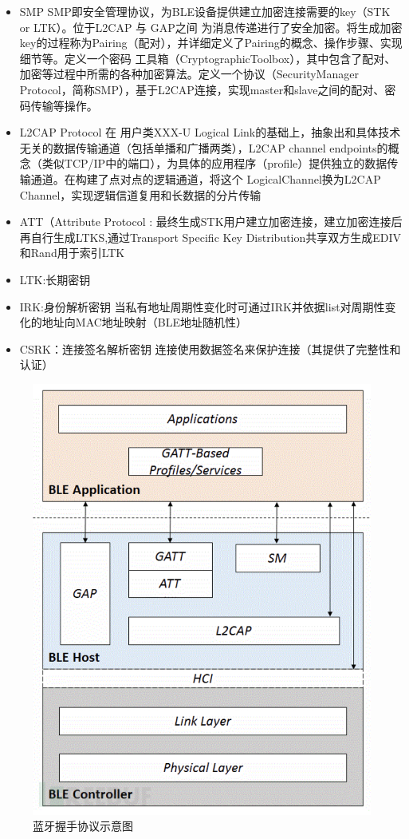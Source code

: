 \begin{itemize}
    \item SMP SMP即安全管理协议，为BLE设备提供建立加密连接需要的key（STK or LTK）。位于L2CAP 与 GAP之间 为消息传递进行了安全加密。将生成加密key的过程称为Pairing（配对），并详细定义了Pairing的概念、操作步骤、实现细节等。定义一个密码 工具箱（CryptographicToolbox），其中包含了配对、加密等过程中所需的各种加密算法。定义一个协议（SecurityManager Protocol，简称SMP），基于L2CAP连接，实现master和slave之间的配对、密码传输等操作。
    \item L2CAP Protocol 在 用户类XXX-U Logical Link的基础上，抽象出和具体技术无关的数据传输通道（包括单播和广播两类），L2CAP channel endpoints的概念（类似TCP/IP中的端口），为具体的应用程序（profile）提供独立的数据传输通道。在构建了点对点的逻辑通道，将这个 LogicalChannel换为L2CAP Channel，实现逻辑信道复用和长数据的分片传输
    \item ATT（Attribute Protocol : 最终生成STK用户建立加密连接，建立加密连接后再自行生成LTKS,通过Transport Specific Key Distribution共享双方生成EDIV和Rand用于索引LTK
    \item LTK:长期密钥
    \item IRK:身份解析密钥   当私有地址周期性变化时可通过IRK并依据list对周期性变化的地址向MAC地址映射（BLE地址随机性）
    \item CSRK：连接签名解析密钥  连接使用数据签名来保护连接（其提供了完整性和认证）
\end{itemize}


\begin{figure}
    \centering
    \includegraphics[scale=0.5]{resources/img/i15.png}
    \caption{蓝牙握手协议示意图}
  \end{figure}

